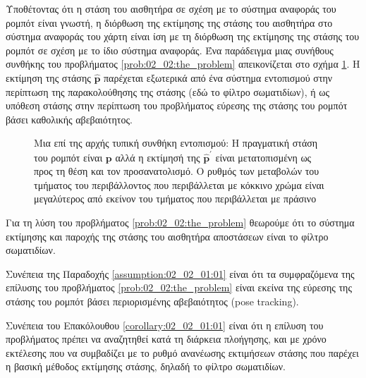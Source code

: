 Υποθέτοντας ότι η στάση του αισθητήρα σε σχέση με το σύστημα αναφοράς του
ρομπότ είναι γνωστή, η διόρθωση της εκτίμησης της στάσης του αισθητήρα στο
σύστημα αναφοράς του χάρτη είναι ίση με τη διόρθωση της εκτίμησης της στάσης
του ρομπότ σε σχέση με το ίδιο σύστημα αναφοράς. Ένα παράδειγμα μιας συνήθους
συνθήκης του προβλήματος \ref{prob:02_02:the_problem} απεικονίζεται στο σχήμα
\ref{fig:02_02:the_problem}. Η εκτίμηση της στάσης $\hat{\bm{p}}$
παρέχεται εξωτερικά από ένα σύστημα εντοπισμού στην περίπτωση της
παρακολούθησης της στάσης (εδώ το φίλτρο σωματιδίων), ή ως υπόθεση στάσης στην
περίπτωση του προβλήματος εύρεσης της στάσης του ρομπότ βάσει καθολικής
αβεβαιότητος.

\begin{figure}[]\centering
  
  \caption{\small Μια επί της αρχής τυπική συνθήκη εντοπισμού: Η πραγματική
           στάση του ρομπότ είναι $\bm{p}$ αλλά η εκτίμησή της
           $\hat{\bm{p}}^\prime$ είναι μετατοπισμένη ως προς τη θέση και τον
           προσανατολισμό. Ο ρυθμός των μεταβολών του τμήματος του
           περιβάλλοντος που περιβάλλεται με κόκκινο χρώμα είναι μεγαλύτερος
           από εκείνον του τμήματος που περιβάλλεται με πράσινο}
  \label{fig:02_02:the_problem}
\end{figure}


\begin{bw_box}
  \begin{assumption}
    \label{assumption:02_02_01:01}
    Για τη λύση του προβλήματος \ref{prob:02_02:the_problem} θεωρούμε ότι το
    σύστημα εκτίμησης και παροχής της στάσης του αισθητήρα αποστάσεων είναι το
    φίλτρο σωματιδίων.
  \end{assumption}
\end{bw_box}

\begin{bw_box}
  \begin{corollary}
    \label{corollary:02_02_01:01}
    Συνέπεια της Παραδοχής \ref{assumption:02_02_01:01} είναι ότι τα
    συμφραζόμενα της επίλυσης του προβλήματος \ref{prob:02_02:the_problem}
    είναι εκείνα της εύρεσης της στάσης του ρομπότ βάσει περιορισμένης
    αβεβαιότητος (pose tracking).
  \end{corollary}
\end{bw_box}

\begin{bw_box}
  \begin{corollary}
    \label{corollary:02_02_01:02}
    Συνέπεια του Επακόλουθου \ref{corollary:02_02_01:01} είναι ότι η επίλυση
    του προβλήματος πρέπει να αναζητηθεί κατά τη διάρκεια πλοήγησης, και με
    χρόνο εκτέλεσης που να συμβαδίζει με το ρυθμό ανανέωσης εκτιμήσεων στάσης
    που παρέχει η βασική μέθοδος εκτίμησης στάσης, δηλαδή το φίλτρο σωματιδίων.
  \end{corollary}
\end{bw_box}

